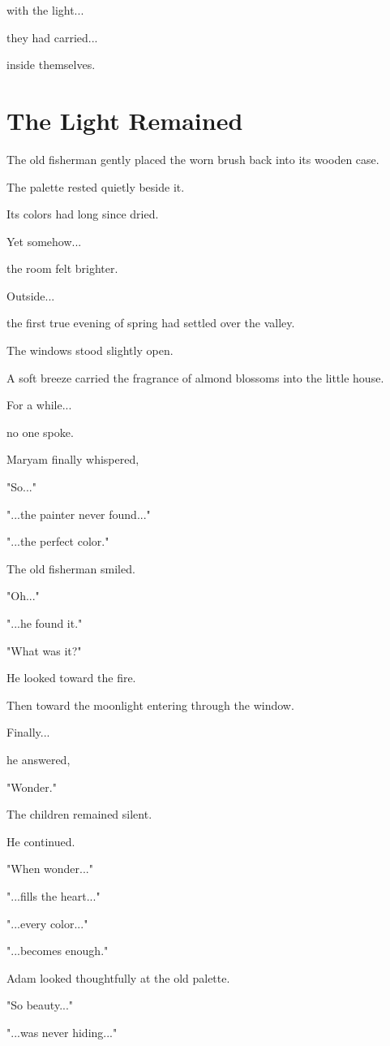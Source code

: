 \documentclass[12pt,openany]{book}
\begin{document}
with the light...

they had carried...

inside themselves.
\section*{The Light Remained}

The old fisherman gently placed the worn brush back into its wooden case.

The palette rested quietly beside it.

Its colors had long since dried.

Yet somehow...

the room felt brighter.

Outside...

the first true evening of spring had settled over the valley.

The windows stood slightly open.

A soft breeze carried the fragrance of almond blossoms into the little house.

For a while...

no one spoke.

Maryam finally whispered,

"So..."

"...the painter never found..."

"...the perfect color."

The old fisherman smiled.

"Oh..."

"...he found it."

"What was it?"

He looked toward the fire.

Then toward the moonlight entering through the window.

Finally...

he answered,

"Wonder."

The children remained silent.

He continued.

"When wonder..."

"...fills the heart..."

"...every color..."

"...becomes enough."

Adam looked thoughtfully at the old palette.

"So beauty..."

"...was never hiding..."
\end{document}
